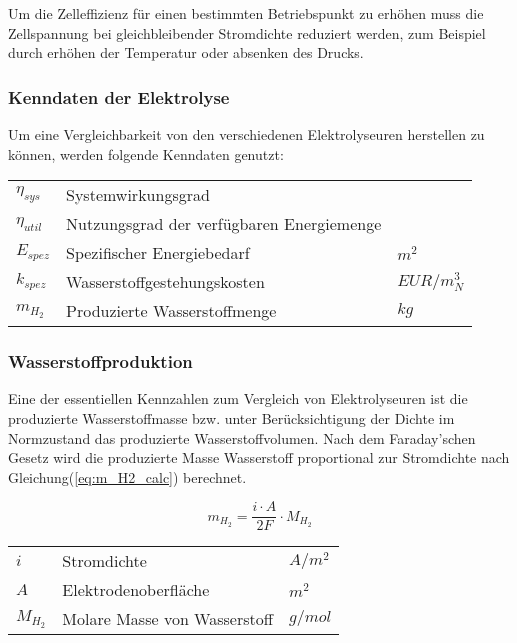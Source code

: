 \documentclass[onecolumn,10pt,titlepage]{article}
\begin{document}
			Um die Zelleffizienz für einen bestimmten Betriebspunkt zu erhöhen muss die Zellspannung bei gleichbleibender Stromdichte reduziert werden, zum Beispiel durch erhöhen der Temperatur oder absenken des Drucks.

			\subsubsection{Kenndaten der Elektrolyse}
			\label{subsubb_Kenndaten}
			Um eine Vergleichbarkeit von den verschiedenen Elektrolyseuren herstellen zu können, werden folgende Kenndaten genutzt:

			\begin{table}[H]
				\begin{tabular*}{\textwidth}{lll}
					$\eta_{sys}$&Systemwirkungsgrad&\\
					$\eta_{util}$&Nutzungsgrad der verfügbaren Energiemenge&\\
					$E_{spez}$&Spezifischer Energiebedarf&$m^2$\\
					$k_{spez}$&Wasserstoffgestehungskosten&$EUR/m^3_N$\\
					$m_{H_2}$&Produzierte Wasserstoffmenge&$kg$\\
				\end{tabular*}
			\end{table}

			\subsubsection*{Wasserstoffproduktion}
			Eine der essentiellen Kennzahlen zum Vergleich von Elektrolyseuren ist die produzierte Wasserstoffmasse bzw. unter Berücksichtigung der Dichte im Normzustand das produzierte Wasserstoffvolumen. Nach dem Faraday’schen Gesetz wird die produzierte Masse Wasserstoff proportional zur Stromdichte nach Gleichung(\ref{eq:m_H2_calc}) berechnet.\cite{Petipas.2013}

			\begin{equation}
				m_{H_2}=\frac{i\cdot A}{2F}\cdot M_{H_2}
				\label{eq:m_H2_calc}
			\end{equation}

			\begin{table}[H]
				\begin{tabular*}{\textwidth}{lll}\\
					$i$&Stromdichte&$A/m^2$\\
					$A$&Elektrodenoberfläche&$m^2$\\
					$M_{H_2}$&Molare Masse von Wasserstoff&$g/mol$\\
				\end{tabular*}
			\end{table}
\end{document}
